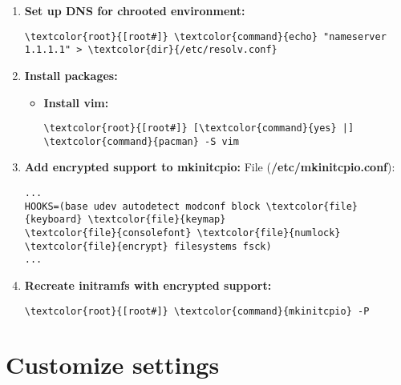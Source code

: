 \documentclass[10pt, a4paper, onecolumn, openany]{book} %
\begin{document}
\begin{enumerate}
    \item \textbf{Set up DNS for chrooted environment:}
\begin{Verbatim}[commandchars=\\\{\}]
\textcolor{root}{[root#]} \textcolor{command}{echo} "nameserver 1.1.1.1" > \textcolor{dir}{/etc/resolv.conf}
\end{Verbatim}

    \item \textbf{Install packages:}
    \begin{itemize}
        \item \textbf{Install vim:}
\begin{Verbatim}[commandchars=\\\{\}]
\textcolor{root}{[root#]} [\textcolor{command}{yes} |] \textcolor{command}{pacman} -S vim
\end{Verbatim}
    \end{itemize}

    \item \textbf{Add encrypted support to mkinitcpio:}
\newline File (\textbf{\textcolor{file}{/etc/mkinitcpio.conf}}):
\begin{Verbatim}[commandchars=\\\{\}]
...
HOOKS=(base udev autodetect modconf block \textcolor{file}{keyboard} \textcolor{file}{keymap}
\textcolor{file}{consolefont} \textcolor{file}{numlock} \textcolor{file}{encrypt} filesystems fsck)
...
\end{Verbatim}

    \item \textbf{Recreate initramfs with encrypted support:}
\begin{Verbatim}[commandchars=\\\{\}]
\textcolor{root}{[root#]} \textcolor{command}{mkinitcpio} -P
\end{Verbatim}
\end{enumerate}
\section{Customize settings}
\end{document}
